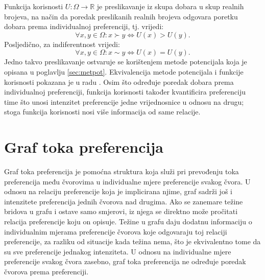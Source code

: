 \documentclass[lmodern, utf8, diplomski, numeric]{fer}
\newcommand{\q}{\left}
\newcommand{\w}{\right}
\begin{document}
  Funkcija korisnosti  $U\colon \Omega \to \mathbb{R}$ je preslikavanje iz skupa dobara u skup realnih brojeva, na način da poredak preslikanih realnih brojeva odgovara poretku dobara prema individualnoj preferenciji, tj. vrijedi:
  \begin{equation*}
    \forall x, y \in \Omega \colon x \succ y \Leftrightarrow U\q(x\w) > U\q(y\w).
  \end{equation*}
  Posljedično, za indiferentnost vrijedi:
  \begin{equation*}
    \forall x, y \in \Omega \colon x \sim y \Leftrightarrow U\q(x\w) = U\q(y\w).
  \end{equation*}
  Jedno takvo preslikavanje ostvaruje se korištenjem metode potencijala koja je opisana u poglavlju \ref{sec:metpot}.
  Ekvivalencija metode potencijala i funkcije korisnosti pokazana je u radu \citep{metpotexact}.
  Osim što određuje poredak dobara prema individualnoj preferenciji, funkcija korisnosti također kvantificira preferenciju time što unosi intenzitet preferencije jedne vrijednosnice u odnosu na drugu; stoga funkcija korisnosti nosi više informacija od same relacije.

  \section{Graf toka preferencija}
  Graf toka preferencija je pomoćna struktura koja služi pri prevođenju toka preferencija među čvorovima u individualne mjere preferencije svakog čvora.
  U odnosu na relaciju preferencije koja je implicirana njime, graf sadrži još i intenzitete preferencija jednih čvorova nad drugima.
  Ako se zanemare težine bridova u grafu i ostave samo smjerovi, iz njega se direktno može pročitati relacija preferencije koju on opisuje.
  Težine u grafu daju dodatnu informaciju o individualnim mjerama preferencije čvorova koje odgovaraju toj relaciji preferencije, za razliku od situacije kada težina nema, što je ekvivalentno tome da su sve preferencije jednakog intenziteta.
  U odnosu na individualne mjere preferencije svakog čvora zasebno, graf toka preferencija ne određuje poredak čvorova prema preferenciji.
  
\end{document}
